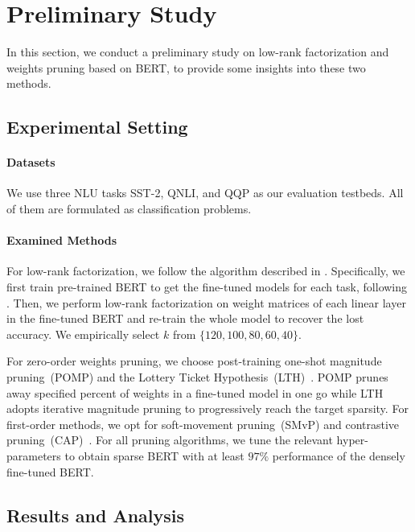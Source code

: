 \section{Preliminary Study}
\label{sec:pilot}
In this section, we conduct a preliminary study on low-rank factorization and weights pruning 
based on BERT, to provide some insights into these two methods.

\subsection{Experimental Setting}
\indent
\paragraph{Datasets}We use three NLU tasks SST-2, QNLI, and QQP as our evaluation testbeds. All of them are formulated as classification problems.

\paragraph{Examined Methods} For low-rank factorization, we follow the algorithm described in . Specifically, we first train pre-trained BERT to get the fine-tuned models for each task, following \citet{bert}. Then, we perform low-rank factorization on weight matrices of each linear layer in the fine-tuned BERT and re-train the whole model to recover the lost accuracy. We empirically select $k$ from $\{120, 100, 80, 60, 40\}$.

For zero-order weights pruning, we choose post-training one-shot magnitude pruning~(POMP) and the Lottery Ticket Hypothesis~(LTH)~\cite{chen2020lottery}. POMP prunes away specified percent of weights in a fine-tuned model in one go while LTH adopts iterative magnitude pruning to progressively reach the target sparsity. For first-order methods, we opt for soft-movement pruning~(SMvP) and contrastive pruning~(CAP)~\cite{cap}. For all pruning algorithms, we tune the relevant hyper-parameters to obtain sparse BERT with at least $97\%$ performance of the densely fine-tuned BERT.

\subsection{Results and Analysis}

